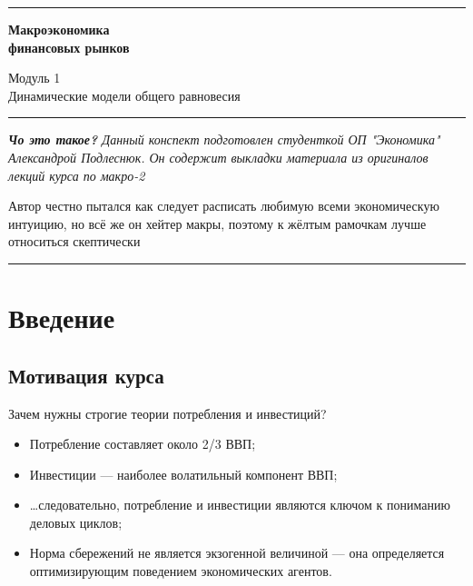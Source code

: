 \documentclass[10pt,a4paper]{article}
\begin{document}
\begin{titlepage}
    \thispagestyle{empty}
    \centering

    \textcolor{mainblue}{\rule{\textwidth}{1.2pt}}

    \vspace{1.2cm}

    {\color{mainblue}\Huge\bfseries Макроэкономика\\[4pt] финансовых рынков\par}

    \vspace{0.8cm}

    {\color{mainblue}\Large Модуль 1\\[2pt] Динамические модели общего равновесия\par}

    \vspace{0.6cm}

    \textcolor{mainblue}{\rule{\textwidth}{0.4pt}}

    \vfill

    \begin{minipage}{0.85\textwidth}
        \small\itshape
        \textbf{Чо это такое?} Данный конспект подготовлен студенткой ОП "Экономика" Александрой Подлеснюк. Он содержит выкладки материала из оригиналов лекций курса по макро-2

        \medskip
        Автор честно пытался как следует расписать любимую всеми экономическую интуицию, но всё же он хейтер макры, поэтому к жёлтым рамочкам лучше относиться скептически
    \end{minipage}

    \vspace{1cm}

    \textcolor{mainblue}{\rule{\textwidth}{1.2pt}}
\end{titlepage}

\newpage
\tableofcontents
\newpage

\section{Введение}
\subsection{Мотивация курса}
 
Зачем нужны строгие теории потребления и инвестиций?
\begin{itemize}
\item Потребление составляет около 2/3 ВВП;
\item Инвестиции — наиболее волатильный компонент ВВП;
\item \dots следовательно, потребление и инвестиции являются ключом к пониманию деловых циклов;
\item Норма сбережений не является экзогенной величиной — она определяется оптимизирующим поведением экономических агентов.
\end{itemize}
 
\end{document}
